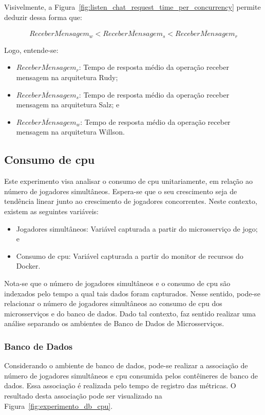 Visivelmente, a Figura~\ref{fig:listen_chat_request_time_per_concurrency} permite deduzir dessa forma que:

$$
  \overline{ReceberMensagem_{w}} < \overline{ReceberMensagem_{s}} <\overline{ReceberMensagem_{r}}
$$

Logo, entende-se:

\begin{itemize}
 \item $\overline{ReceberMensagem_{r}}$: Tempo de resposta médio da operação receber mensagem na arquitetura Rudy;
 \item $\overline{ReceberMensagem_{s}}$: Tempo de resposta médio da operação receber mensagem na arquitetura Salz; e
 \item $\overline{ReceberMensagem_{w}}$: Tempo de resposta médio da operação receber mensagem na arquitetura Willson.
\end{itemize}

\subsection{Consumo de \ac{cpu}}
\label{sec:exp_cpu}
Este experimento visa analisar o consumo de \ac{cpu} unitariamente, em relação ao número de jogadores simultâneos.
%
Espera-se que o seu crescimento seja de tendência linear junto ao crescimento de jogadores concorrentes.
%
Neste contexto, existem as seguintes variáveis:

\begin{itemize}
    \item Jogadores simultâneos: Variável capturada a partir do microsserviço de jogo; e
    \item Consumo de \ac{cpu}: Variável capturada a partir do monitor de recursos do Docker.
\end{itemize}

Nota-se que o número de jogadores simultâneos e o consumo de \ac{cpu} são indexados pelo tempo a qual tais dados foram capturados.
%
Nesse sentido, pode-se relacionar o número de jogadores simultâneos ao consumo de \ac{cpu} dos microsserviços e do banco de dados.
%
Dado tal contexto, faz sentido realizar uma análise separando os ambientes de Banco de Dados de Microsserviços.

\subsubsection{Banco de Dados}

Considerando o ambiente de banco de dados, pode-se realizar a associação de número de jogadores simultâneos e \ac{cpu} consumida pelos contêineres de banco de dados.
%
Essa associação é realizada pelo tempo de registro das métricas.
%
O resultado desta associação pode ser visualizado na Figura~\ref{fig:experimento_db_cpu}.




